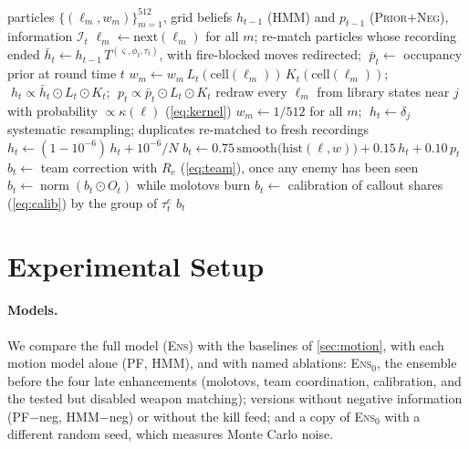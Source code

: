\documentclass[11pt]{article}
\newcommand{\model}[1]{\textsc{#1}}
\newcommand{\norm}{\operatorname{norm}}
\newcommand{\1}{\mathbb{1}}
\begin{document}
\begin{algorithm}[t]
\caption{One step of the ensemble filter for a hidden enemy $e$. Lines 12--14 reshape only the reported belief.}
\label{alg:step}
\begin{algorithmic}[1]
\Require particles $\{(\ell_m, w_m)\}_{m=1}^{512}$, grid beliefs $h_{t-1}$ (\model{HMM}) and $p_{t-1}$ (\model{Prior+Neg}), information $\mathcal{I}_t$
\State $\ell_m \gets \mathrm{next}(\ell_m)$ for all $m$; re-match particles whose recording ended 
\State $\bar h_t \gets h_{t-1}\, T^{(\varsigma,\phi_t,\tau_t)}$, with fire-blocked moves redirected; $\;\bar p_t \gets$ occupancy prior at round time $t$
\State $w_m \gets w_m\, L_t(\mathrm{cell}(\ell_m))\, K_t(\mathrm{cell}(\ell_m))$; $\;h_t \propto \bar h_t \odot L_t \odot K_t$; $\;p_t \propto \bar p_t \odot L_t \odot K_t$ 
  \State redraw every $\ell_m$ from library states near $j$ with probability $\propto \kappa(\ell)$ (\cref{eq:kernel})
  \State $w_m \gets 1/512$ for all $m$; $\;h_t \gets \delta_j$
  \State systematic resampling; duplicates re-matched to fresh recordings
\EndIf
\State $h_t \gets (1 - 10^{-6})\, h_t + 10^{-6}/N$
\State $b_t \gets 0.75\, \mathrm{smooth}\big(\mathrm{hist}(\ell, w)\big) + 0.15\, h_t + 0.10\, p_t$
\State $b_t \gets$ team correction with $R_e$ (\cref{eq:team}), once any enemy has been seen 
\State $b_t \gets \norm(b_t \odot O_t)$ while molotovs burn
\State $b_t \gets$ calibration of callout shares (\cref{eq:calib}) by the group of $\tau^e_t$
\State \Return $b_t$
\end{algorithmic}
\end{algorithm}

\section{Experimental Setup}
\label{sec:setup}

\paragraph{Models.} We compare the full model (\model{Ens}) with the baselines of \cref{sec:motion}, with each motion model alone (\model{PF}, \model{HMM}), and with named ablations: \model{Ens$_0$}, the ensemble before the four late enhancements (molotovs, team coordination, calibration, and the tested but disabled weapon matching); versions without negative information (\model{PF}$-$neg, \model{HMM}$-$neg) or without the kill feed; and a copy of \model{Ens$_0$} with a different random seed, which measures Monte Carlo noise.
\end{document}
